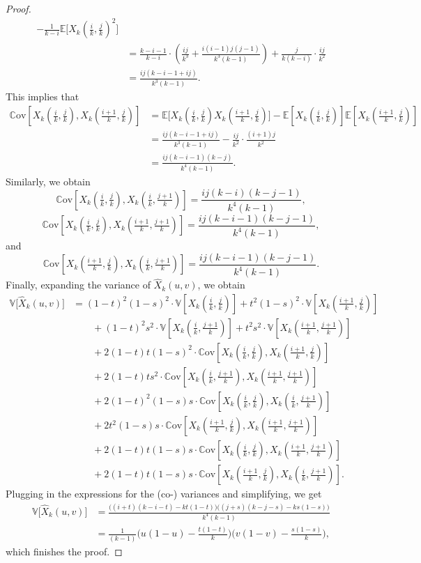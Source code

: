 \documentclass[12pt,a4paper]{amsart}
\theoremstyle{definition}
\newcommand{\Xhat}{\widehat{X}}
\newcommand{\EE}{\mathbb{E}}
\newcommand{\VV}{\mathbb{V}}
\newcommand{\Cov}{\mathbb{C}\mathrm{ov}}
\begin{document}
\begin{proof}
\begin{align*}
    - \frac{1}{k-i}\EE\big[X_k(\tfrac{i}{k},\tfrac{j}{k})^2\big] \\
    &=  \frac{k-i-1}{k-i} \cdot \left(\frac{ij}{k^3} + \frac{i(i-1)j(j-1)}{k^3 (k-1)}\right) + \frac{j}{k(k-i)}\cdot \frac{ij}{k^2} \\
    &=  \frac{ij(k-i-1+ij)}{k^3(k-1)}.
\end{align*}
This implies that
\begin{align*}
    \Cov[X_k(\tfrac{i}{k},\tfrac{j}{k}), X_k(\tfrac{i+1}{k},\tfrac{j}{k})] &= \EE\big[X_k(\tfrac{i}{k},\tfrac{j}{k})X_k(\tfrac{i+1}{k},\tfrac{j}{k})\big] - \EE[X_k(\tfrac{i}{k},\tfrac{j}{k})]\EE[X_k(\tfrac{i+1}{k},\tfrac{j}{k})] \\
    &=  \frac{ij(k-i-1+ij)}{k^3(k-1)} - \frac{ij}{k^2}\cdot\frac{(i+1)j}{k^2} \\
    &=  \frac{ij(k-i-1)(k-j)}{k^4(k-1)}. 
\end{align*}
Similarly, we obtain
$$\Cov[X_k(\tfrac{i}{k},\tfrac{j}{k}), X_k(\tfrac{i}{k},\tfrac{j+1}{k})] = \frac{ij(k-i)(k-j-1)}{k^4(k-1)}, $$
$$\Cov[X_k(\tfrac{i}{k},\tfrac{j}{k}), X_k(\tfrac{i+1}{k},\tfrac{j+1}{k})] = \frac{ij(k-i-1)(k-j-1)}{k^4(k-1)}, $$
and
$$\Cov[X_k(\tfrac{i+1}{k},\tfrac{j}{k}), X_k(\tfrac{i}{k},\tfrac{j+1}{k})] = \frac{ij(k-i-1)(k-j-1)}{k^4(k-1)}. $$
Finally, expanding the variance of $\Xhat_k(u,v)$, we obtain
\begin{align*}
    \VV\big[\Xhat_k(u,v)\big] &= (1-t)^2(1-s)^2\cdot\VV[X_k(\tfrac{i}{k},\tfrac{j}{k})] + t^2(1-s)^2\cdot\VV[X_k(\tfrac{i+1}{k},\tfrac{j}{k})] \\
    & \qquad + (1-t)^2s^2\cdot\VV[X_k(\tfrac{i}{k},\tfrac{j+1}{k})]+t^2s^2 \cdot\VV[X_k(\tfrac{i+1}{k},\tfrac{j+1}{k})] \\
    & \qquad + 2(1-t)t(1-s)^2\cdot\Cov[X_k(\tfrac{i}{k},\tfrac{j}{k}), X_k(\tfrac{i+1}{k},\tfrac{j}{k})]  \\
    & \qquad + 2(1-t)ts^2\cdot\Cov[X_k(\tfrac{i}{k},\tfrac{j+1}{k}), X_k(\tfrac{i+1}{k},\tfrac{j+1}{k})] \\
    & \qquad + 2(1-t)^2(1-s)s\cdot\Cov[X_k(\tfrac{i}{k},\tfrac{j}{k}), X_k(\tfrac{i}{k},\tfrac{j+1}{k})]  \\
    & \qquad + 2t^2(1-s)s\cdot\Cov[X_k(\tfrac{i+1}{k},\tfrac{j}{k}), X_k(\tfrac{i+1}{k},\tfrac{j+1}{k})] \\
    & \qquad + 2(1-t)t(1-s)s\cdot\Cov[X_k(\tfrac{i}{k},\tfrac{j}{k}), X_k(\tfrac{i+1}{k},\tfrac{j+1}{k})]  \\
    & \qquad + 2(1-t)t(1-s)s\cdot\Cov[X_k(\tfrac{i+1}{k},\tfrac{j}{k}), X_k(\tfrac{i}{k},\tfrac{j+1}{k})].
\end{align*}
Plugging in the expressions for the (co-) variances and simplifying, we get
\begin{align*}
    \VV\big[\Xhat_k(u,v)\big]
    &=\frac{\big((i+t)(k-i-t)-kt(1-t)\big)\big((j+s)(k-j-s)-ks(1-s)\big)}{k^4(k-1)} \\
    &= \frac{1}{(k-1)}\Big(u(1-u)-\frac{t(1-t)}{k}\Big)\Big(v(1-v)-\frac{s(1-s)}{k}\Big),
\end{align*}
which finishes the proof.
\end{proof}
\end{document}
